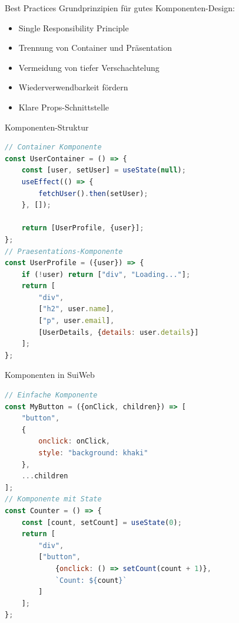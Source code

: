 \begin{theorem}{Best Practices}
    Grundprinzipien für gutes Komponenten-Design:
    \begin{itemize}
        \item Single Responsibility Principle
        \item Trennung von Container und Präsentation
        \item Vermeidung von tiefer Verschachtelung
        \item Wiederverwendbarkeit fördern
        \item Klare Props-Schnittstelle
    \end{itemize}
\end{theorem}

\begin{KR}{Komponenten-Struktur}
\begin{lstlisting}[language=JavaScript, style=basesmol]
// Container Komponente
const UserContainer = () => {
    const [user, setUser] = useState(null);
    useEffect(() => {
        fetchUser().then(setUser);
    }, []);
    
    return [UserProfile, {user}];
};
// Praesentations-Komponente
const UserProfile = ({user}) => {
    if (!user) return ["div", "Loading..."];
    return [
        "div",
        ["h2", user.name],
        ["p", user.email],
        [UserDetails, {details: user.details}]
    ];
};
\end{lstlisting}
\end{KR}

\begin{KR}{Komponenten in SuiWeb}
\begin{lstlisting}[language=JavaScript, style=basesmol]
// Einfache Komponente
const MyButton = ({onClick, children}) => [
    "button",
    {
        onclick: onClick,
        style: "background: khaki"
    },
    ...children
];
// Komponente mit State
const Counter = () => {
    const [count, setCount] = useState(0);
    return [
        "div",
        ["button", 
            {onclick: () => setCount(count + 1)},
            `Count: ${count}`
        ]
    ];
};
\end{lstlisting}
\end{KR}

